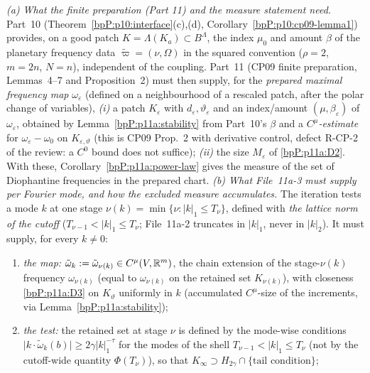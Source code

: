 \begin{remark}\label{bpP:p11a:consumers}
\emph{(a) What the finite preparation (Part 11) and the measure statement need.} Part~10 (Theorem~\ref{bpP:p10:interface}(c),(d), Corollary~\ref{bpP:p10:cp09-lemma1}) provides, on a good patch $K=\Lambda(K_a)\subset B^\Lambda$, the index $\mu_0$ and amount $\beta$ of the planetary frequency data $\tilde\varpi=(\nu,\Omega)$ in the squared convention ($\rho=2$, $m=2n$, $N=n$), independent of the coupling. Part~11 (CP09 finite preparation, Lemmas~4--7 and Proposition~2) must then supply, for the \emph{prepared maximal frequency map} $\omega_\varepsilon$ (defined on a neighbourhood of a rescaled patch, after the polar change of variables), \emph{(i)} a patch $K_\varepsilon$ with $d_\varepsilon,\vartheta_\varepsilon$ and an index/amount $(\mu,\beta_\varepsilon)$ of $\omega_\varepsilon$, obtained by Lemma~\ref{bpP:p11a:stability} from Part~10's $\beta$ and a \emph{$C^\mu$-estimate} for $\omega_\varepsilon-\omega_0$ on $K_{\varepsilon,\vartheta}$ (this is CP09 Prop.~2 with derivative control, defect R-CP-2 of the review: a $C^0$ bound does not suffice); \emph{(ii)} the size $M_\varepsilon$ of \ref{bpP:p11a:D2}. With these, Corollary~\ref{bpP:p11a:power-law} gives the measure of the set of Diophantine frequencies in the prepared chart. \emph{(b) What File~11a-3 must supply per Fourier mode, and how the excluded measure accumulates.} The iteration tests a mode $k$ at one stage $\nu(k)=\min\{\nu:\lvert k\rvert_1\le T_\nu\}$, defined with \emph{the lattice norm of the cutoff} ($T_{\nu-1}<\lvert k\rvert_1\le T_\nu$; File~11a-2 truncates in $\lvert k\rvert_1$, never in $\lvert k\rvert_2$). It must supply, for every $k\ne0$:
\begin{enumerate}[label=(I\arabic*),ref=(I\arabic*)]
\item\label{bpP:p11a:I1} \emph{the map:} $\tilde\omega_k:=\tilde\omega_{\nu(k)}\in C^\mu(V,\mathbb{R}^m)$, the chain extension of the stage-$\nu(k)$ frequency $\omega_{\nu(k)}$ (equal to $\omega_{\nu(k)}$ on the retained set $K_{\nu(k)}$), with closeness \ref{bpP:p11a:D3} on $K_\vartheta$ uniformly in $k$ (accumulated $C^\mu$-size of the increments, via Lemma~\ref{bpP:p11a:stability});
\item\label{bpP:p11a:I2} \emph{the test:} the retained set at stage $\nu$ is defined by the mode-wise conditions $\lvert k\cdot\tilde\omega_k(b)\rvert\ge2\gamma\lvert k\rvert_1^{-\tau}$ for the modes of the shell $T_{\nu-1}<\lvert k\rvert_1\le T_\nu$ (not by the cutoff-wide quantity $\Phi(T_\nu)$), so that $K_\infty\supset H_{2\gamma}\cap\{\text{tail condition}\}$;

\end{enumerate}
\end{remark}
